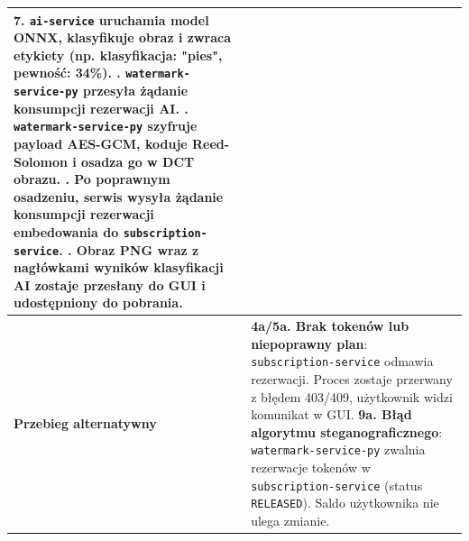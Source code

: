 \documentclass[12pt,a4paper]{article}
\begin{document}
\begin{table}[H]
\begin{tabularx}{\textwidth}{lX}
7. \texttt{ai-service} uruchamia model ONNX, klasyfikuje obraz i zwraca etykiety (np. klasyfikacja: "pies", pewność: 34\%). \newline
8. \texttt{watermark-service-py} przesyła żądanie konsumpcji rezerwacji AI. \newline
9. \texttt{watermark-service-py} szyfruje payload AES-GCM, koduje Reed-Solomon i osadza go w DCT obrazu. \newline
10. Po poprawnym osadzeniu, serwis wysyła żądanie konsumpcji rezerwacji embedowania do \texttt{subscription-service}. \newline
11. Obraz PNG wraz z nagłówkami wyników klasyfikacji AI zostaje przesłany do GUI i udostępniony do pobrania. \\
\midrule
\textbf{Przebieg alternatywny} & 
\textbf{4a/5a. Brak tokenów lub niepoprawny plan}: \texttt{subscription-service} odmawia rezerwacji. Proces zostaje przerwany z błędem 403/409, użytkownik widzi komunikat w GUI. \newline
\textbf{9a. Błąd algorytmu steganograficznego}: \texttt{watermark-service-py} zwalnia rezerwacje tokenów w \texttt{subscription-service} (status \texttt{RELEASED}). Saldo użytkownika nie ulega zmianie. \\
\bottomrule
\end{tabularx}
\end{table}

\newpage
\end{document}
